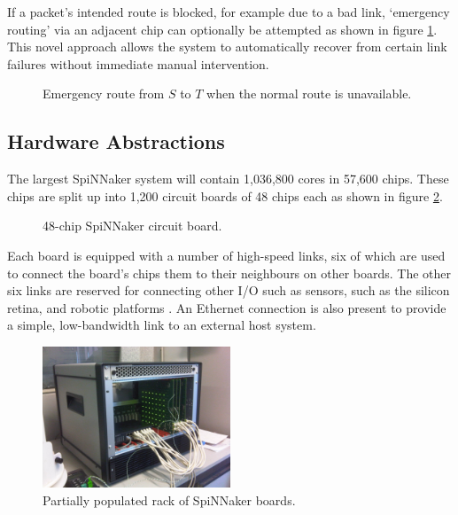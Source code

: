 				If a packet's intended route is blocked, for example due to a bad link,
				`emergency routing' via an adjacent chip can optionally be attempted as
				shown in figure \ref{fig:emergency-routing}. This novel approach allows
				the system to automatically recover from certain link failures without
				immediate manual intervention.
				
				\begin{figure}
					\center
					
					\caption[Emergency routing example.]{Emergency route from $S$ to $T$
					when the normal route is unavailable.}
					\label{fig:emergency-routing}
				\end{figure}
			
		
		\subsection{Hardware Abstractions}
			
			
			The largest SpiNNaker system will contain 1,036,800 cores in 57,600 chips.
			These chips are split up into 1,200 circuit boards of 48 chips each as
			shown in figure \ref{fig:spinn4labelled}.
			
			\begin{figure}
				\center
				
				\caption{48-chip SpiNNaker circuit board.}
				\label{fig:spinn4labelled}
			\end{figure}
			
			Each board is equipped with a number of high-speed links, six of which are
			used to connect the board's chips them to their neighbours on other
			boards. The other six links are reserved for connecting other I/O such as
			sensors, such as the silicon retina, and robotic platforms
			\cite{davies10}. An Ethernet connection is also present to provide a
			simple, low-bandwidth link to an external host system.
			
			\begin{figure}
				\center
				\includegraphics[width=0.5\textwidth]{figures/spiNNaker103.jpg}
				\caption{Partially populated rack of SpiNNaker boards.}
				\label{fig:spiNNaker103}
			\end{figure}
			
